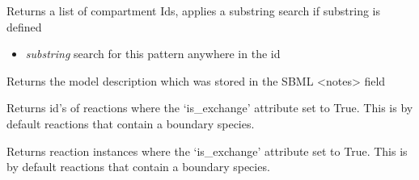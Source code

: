 \documentclass[a4paper,11pt,english]{sphinxmanual}
\begin{document}
\begin{fulllineitems}
\begin{fulllineitems}
\end{fulllineitems}


\begin{fulllineitems}
\label{modules_doc:cbmpy.CBModel.Model.getCompartmentIds}
Returns a list of compartment Ids, applies a substring search if substring is defined
\begin{itemize}
\item {} 
\emph{substring} search for this pattern anywhere in the id

\end{itemize}

\end{fulllineitems}


\begin{fulllineitems}
\label{modules_doc:cbmpy.CBModel.Model.getDescription}
Returns the model description which was stored in the SBML \textless{}notes\textgreater{} field

\end{fulllineitems}


\begin{fulllineitems}
\label{modules_doc:cbmpy.CBModel.Model.getExchangeReactionIds}
Returns id's of reactions where the `is\_exchange' attribute set to True. This is by default
reactions that contain a boundary species.

\end{fulllineitems}


\begin{fulllineitems}
\label{modules_doc:cbmpy.CBModel.Model.getExchangeReactions}
Returns reaction instances where the `is\_exchange' attribute set to True. This is by default
reactions that contain a boundary species.

\end{fulllineitems}



\end{fulllineitems}
\end{document}
